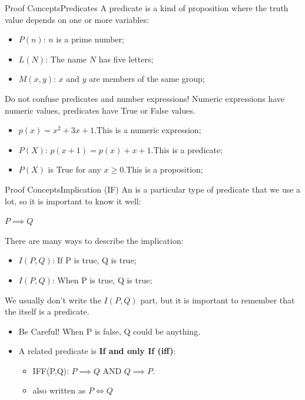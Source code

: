 \begin{frame}{Proof Concepts}{Predicates}
  A predicate is a kind of proposition where the truth value depends on one or more variables:\bigskip

  \begin{itemize}
    \item $P(n)$: $n$ is a prime number;
    \item $L(N)$: The name $N$ has five letters;
    \item $M(x,y)$: $x$ and $y$ are members of the same group;
  \end{itemize}\vfill

  \begin{alertblock}{Do not confuse predicates and number expressions!}
    Numeric expressions have numeric values, predicates have True or False values.
    \begin{itemize}
      \item $p(x) = x^2 + 3x + 1$.\hfill This is a numeric expression;
      \item $P(X)$: $p(x+1) = p(x) + x + 1$.\hfill This is a predicate;
      \item $P(X)$ is True for any $x \geq 0$.\hfill This is a proposition;
    \end{itemize}
  \end{alertblock}
\end{frame}

\begin{frame}{Proof Concepts}{Implication (IF)}
  An  is a particular type of predicate that we use a lot, so it is important to know it well:
  \begin{center}
    $P \implies Q$
  \end{center}
  There are many ways to describe the implication:
  \begin{itemize}
    \item $I(P,Q)$: If P is true, Q is true;
    \item $I(P,Q)$: When P is true, Q is true;
  \end{itemize}
  We usually don't write the $I(P,Q)$ part, but it is important to remember that the  itself is a predicate.
  \bigskip

  \begin{itemize}
    \item \alert{Be Careful!} When P is false, Q could be anything.
    \item A related predicate is {\bf If and only If (iff)}:
    \begin{itemize}
      \item IFF(P,Q): $P\implies Q$ AND $Q\implies P$.
      \item also written as $P\iff Q$
    \end{itemize}
  \end{itemize}
\end{frame}

